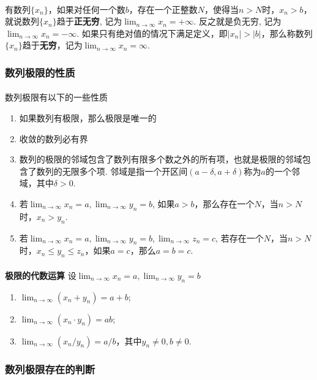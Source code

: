 \paragraph{}
有数列$\{x_n\}$，如果对任何一个数$b$，存在一个正整数$N$，使得当$n > N$时，$x_n > b$，就说数列$\{x_n\}$趋于\textbf{正无穷}, 记为$\lim_{n\to \infty} x_n = +\infty$.  反之就是负无穷, 记为$\lim_{n\to \infty} x_n = -\infty$.  如果只有绝对值的情况下满足定义，即$|x_n| > |b|$，那么称数列$\{x_n\}$趋于\textbf{无穷}，记为$\lim_{n\to \infty} x_n = \infty$.

\subsubsection{数列极限的性质}
\paragraph{}
数列极限有以下的一些性质
\begin{enumerate}
\item 如果数列有极限，那么极限是唯一的
\item 收敛的数列必有界
\item 数列的极限的邻域包含了数列有限多个数之外的所有项，也就是极限的邻域包含了数列的无限多个项. 邻域是指一个开区间$(a - \delta, a + \delta)$称为$a$的一个邻域，其中$\delta > 0$. 
\item 若$\lim_{n\to \infty} x_n = a, \lim_{n\to \infty} y_n = b$, 如果$a > b$，那么存在一个$N$，当$n > N$时，$x_n > y_n$. 
\item 若$\lim_{n\to \infty} x_n = a, \lim_{n\to \infty} y_n = b, \lim_{n\to \infty} z_n = c$,  若存在一个$N$，当$n > N$时，$x_n \leq y_n \leq z_n$，如果$a = c$，那么$a = b = c$. 
\end{enumerate}

\paragraph{}
\textbf{极限的代数运算} \: 设$\lim_{n\to \infty} x_n = a, \lim_{n\to \infty} y_n = b$
\begin{enumerate}
\item  $\lim_{n\to \infty} (x_n + y_n) = a + b$;
\item $\lim_{n\to \infty} (x_n \cdot y_n) = ab$;
\item $\lim_{n\to \infty} (x_n / y_n) = a/b$，其中$y_n \neq 0, b \neq 0$.
\end{enumerate}

\subsubsection{数列极限存在的判断}
